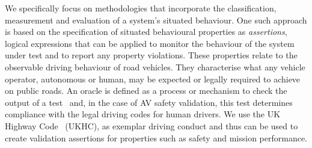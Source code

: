 We specifically focus on methodologies that incorporate the classification, measurement and evaluation of a system's situated behaviour. One such approach is based on the specification of situated behavioural properties as \emph{assertions}, logical expressions that can be applied 
to monitor the behaviour of the system under test and to report any property violations. 
%
These properties relate to the observable driving behaviour of road vehicles. They characterise what any vehicle operator, autonomous or human, %
%
%
may be expected or legally required to achieve on public roads. 
%
An oracle is defined as a process or mechanism to check the output of a test~\cite{howden1978theoretical}
and, in the case of AV safety validation, this test 
determines compliance with the 
legal driving codes for human drivers.
%
%
We use the UK Highway Code~\cite{highwayCode} (UKHC), as exemplar driving conduct and thus can be used to create validation assertions for properties such as safety and mission performance. %



